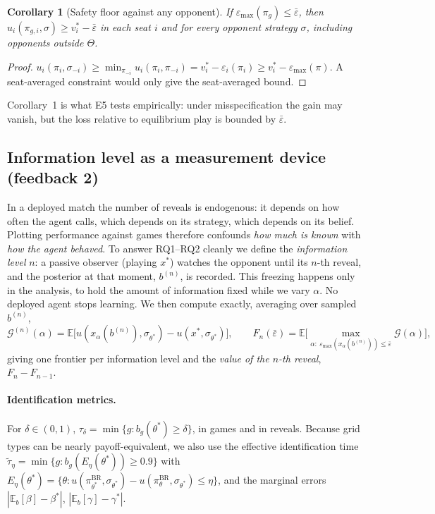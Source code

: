 \documentclass[11pt]{article}
\newtheorem{corollary}{Corollary}
\newcommand{\eps}{\varepsilon}
\newcommand{\epsbar}{\bar{\eps}}
\newcommand{\emax}{\eps_{\max}}
\newcommand{\BR}{\mathrm{BR}}
\newcommand{\new}[1]{\textcolor{blue!55!black}{#1}}
\begin{document}
{\begin{corollary}[Safety floor against any opponent]
If $\emax(\pi_g)\le\epsbar$, then $u_i(\pi_{g,i},\sigma)\ge v_i^*-\epsbar$ \emph{in each seat $i$} and for \emph{every} opponent strategy $\sigma$, including opponents outside $\Theta$.
\end{corollary}
\begin{proof} $u_i(\pi_i,\sigma_{-i})\ge\min_{\pi_{-i}}u_i(\pi_i,\pi_{-i})=v_i^*-\eps_i(\pi_i)\ge v_i^*-\emax(\pi)$. A seat-averaged constraint would only give the seat-averaged bound.\end{proof}
Corollary~1 is what E5 tests empirically: under misspecification the gain may vanish, but the loss relative to equilibrium play is bounded by $\epsbar$.}

\new{\subsection{Information level as a measurement device (feedback 2)}
In a deployed match the number of reveals is endogenous: it depends on how often the agent calls, which depends on its strategy, which depends on its belief. Plotting performance against games therefore confounds \emph{how much is known} with \emph{how the agent behaved}. To answer RQ1--RQ2 cleanly we define the \emph{information level} $n$: a passive observer (playing $x^*$) watches the opponent until its $n$-th reveal, and the posterior at that moment, $b^{(n)}$, is recorded. This freezing happens only in the analysis, to hold the amount of information fixed while we vary $\alpha$. No deployed agent stops learning. We then compute exactly, averaging over sampled $b^{(n)}$,
\[
\mathcal G^{(n)}(\alpha)=\mathbb E\big[u(x_\alpha(b^{(n)}),\sigma_{\theta^*})-u(x^*,\sigma_{\theta^*})\big],\qquad
F_n(\epsbar)=\mathbb E\Big[\max_{\alpha:\ \emax(x_\alpha(b^{(n)}))\le\epsbar}\mathcal G(\alpha)\Big],
\]
giving one frontier per information level and the \emph{value of the $n$-th reveal}, $F_n-F_{n-1}$.}

\paragraph{Identification metrics.} For $\delta\in(0,1)$, $\tau_\delta=\min\{g:b_g(\theta^*)\ge\delta\}$, in games and in reveals. Because grid types can be nearly payoff-equivalent, we also use the effective identification time $\tilde\tau_\eta=\min\{g:b_g(E_\eta(\theta^*))\ge0.9\}$ with $E_\eta(\theta^*)=\{\theta:u(\pi^{\BR}_{\theta^*},\sigma_{\theta^*})-u(\pi^{\BR}_\theta,\sigma_{\theta^*})\le\eta\}$, and the marginal errors $|\mathbb E_b[\beta]-\beta^*|$, $|\mathbb E_b[\gamma]-\gamma^*|$.
\end{document}

